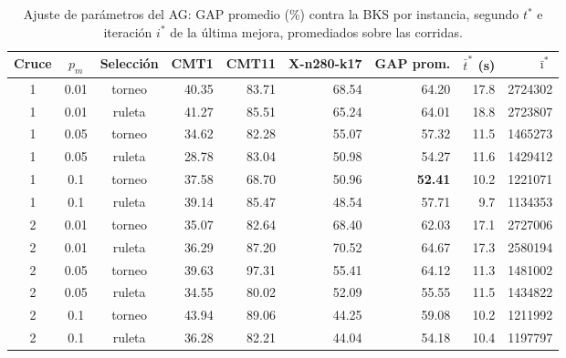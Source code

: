\begin{table}[htbp]
\centering
\small
\begin{tabular}{cccrrrrrr}
\toprule
Cruce & $p_m$ & Selección & CMT1 & CMT11 & X-n280-k17 & GAP prom. & $\bar t^*$ (s) & $\bar\imath^*$ \\
\midrule
1 & 0.01 & torneo & 40.35 & 83.71 & 68.54 & 64.20 & 17.8 & 2724302 \\
1 & 0.01 & ruleta & 41.27 & 85.51 & 65.24 & 64.01 & 18.8 & 2723807 \\
1 & 0.05 & torneo & 34.62 & 82.28 & 55.07 & 57.32 & 11.5 & 1465273 \\
1 & 0.05 & ruleta & 28.78 & 83.04 & 50.98 & 54.27 & 11.6 & 1429412 \\
1 & 0.1 & torneo & 37.58 & 68.70 & 50.96 & \textbf{52.41} & 10.2 & 1221071 \\
1 & 0.1 & ruleta & 39.14 & 85.47 & 48.54 & 57.71 & 9.7 & 1134353 \\
2 & 0.01 & torneo & 35.07 & 82.64 & 68.40 & 62.03 & 17.1 & 2727006 \\
2 & 0.01 & ruleta & 36.29 & 87.20 & 70.52 & 64.67 & 17.3 & 2580194 \\
2 & 0.05 & torneo & 39.63 & 97.31 & 55.41 & 64.12 & 11.3 & 1481002 \\
2 & 0.05 & ruleta & 34.55 & 80.02 & 52.09 & 55.55 & 11.5 & 1434822 \\
2 & 0.1 & torneo & 43.94 & 89.06 & 44.25 & 59.08 & 10.2 & 1211992 \\
2 & 0.1 & ruleta & 36.28 & 82.21 & 44.04 & 54.18 & 10.4 & 1197797 \\
\bottomrule
\end{tabular}
\caption{Ajuste de parámetros del AG: GAP promedio (\%) contra la BKS por instancia, segundo $t^*$ e iteración $i^*$ de la última mejora, promediados sobre las corridas.}
\label{tab:ajuste_ag}
\end{table}

